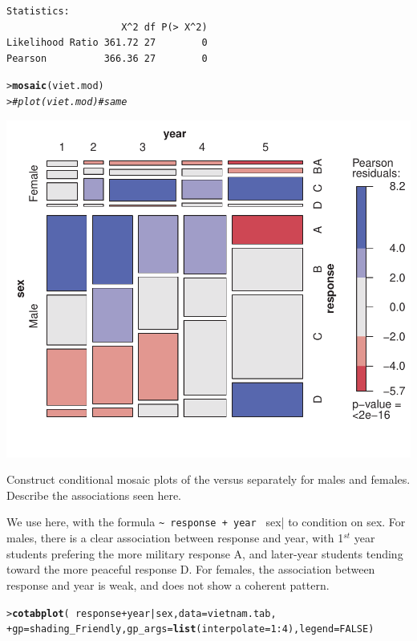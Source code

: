 \documentclass[10pt]{report}\usepackage[]{graphicx}\usepackage[]{color}
\makeatletter
\newcommand{\hlnum}[1]{\textcolor[rgb]{0.686,0.059,0.569}{#1}}%
\newcommand{\hlcom}[1]{\textcolor[rgb]{0.678,0.584,0.686}{\textit{#1}}}%
\newcommand{\hlopt}[1]{\textcolor[rgb]{0,0,0}{#1}}%
\newcommand{\hlstd}[1]{\textcolor[rgb]{0.345,0.345,0.345}{#1}}%
\newcommand{\hlkwc}[1]{\textcolor[rgb]{0.333,0.667,0.333}{#1}}%
\newcommand{\hlkwd}[1]{\textcolor[rgb]{0.737,0.353,0.396}{\textbf{#1}}}%
\newenvironment{kframe}{%
 \def\at@end@of@kframe{}%
 \ifinner\ifhmode%
  \def\at@end@of@kframe{\end{minipage}}%
  \begin{minipage}{\columnwidth}%
 \fi\fi%
 \def\FrameCommand##1{\hskip\@totalleftmargin \hskip-\fboxsep
 \colorbox{shadecolor}{##1}\hskip-\fboxsep
     \hskip-\linewidth \hskip-\@totalleftmargin \hskip\columnwidth}%
 \MakeFramed {\advance\hsize-\width
   \@totalleftmargin\z@ \linewidth\hsize
   \@setminipage}}%
 {\par\unskip\endMakeFramed%
 \at@end@of@kframe}
\newenvironment{knitrout}{}{} %
\renewenvironment{knitrout}{\small\renewcommand{\baselinestretch}{.85}}{} %
\makeatother
\begin{document}
\begin{Exercises}
\begin{enumerate*}
\begin{ans}
\begin{knitrout}
\begin{kframe}
\begin{verbatim}
Statistics:
                    X^2 df P(> X^2)
Likelihood Ratio 361.72 27        0
Pearson          366.36 27        0
\end{verbatim}
\begin{alltt}
\hlstd{> }\hlkwd{mosaic}\hlstd{(viet.mod)}
\hlstd{> }\hlcom{# plot(viet.mod)     # same}
\end{alltt}
\end{kframe}

\centerline{\includegraphics[width=.5\textwidth]{soln/fig/ex5_10a-1} }



\end{knitrout}

      \end{ans}
      
      \item Construct conditional mosaic plots of the  versus  separately for males and females.
      Describe the associations seen here.
      \begin{ans}
      We use  here, with the formula \verb|~ response + year | sex| to condition on sex.
      For males, there is a clear association between response and year, with 1$^{st}$ year students prefering
      the more military response A, and later-year students tending toward the more peaceful response D.
      For females, the association between response and year is weak, and does not show a coherent pattern.
\begin{knitrout}\footnotesize
{}\color{fgcolor}\begin{kframe}
\begin{alltt}
\hlstd{> }\hlkwd{cotabplot}\hlstd{(}\hlopt{~} \hlstd{response} \hlopt{+} \hlstd{year} \hlopt{|} \hlstd{sex,} \hlkwc{data}\hlstd{=vietnam.tab,}
\hlstd{+ }                                  \hlkwc{gp}\hlstd{=shading_Friendly,} \hlkwc{gp_args}\hlstd{=}\hlkwd{list}\hlstd{(}\hlkwc{interpolate}\hlstd{=}\hlnum{1}\hlopt{:}\hlnum{4}\hlstd{),} \hlkwc{legend}\hlstd{=}\hlnum{FALSE}\hlstd{)}
\end{alltt}
\end{kframe}


\end{knitrout}
\end{ans}
\end{enumerate*}
\end{Exercises}
\end{document}
